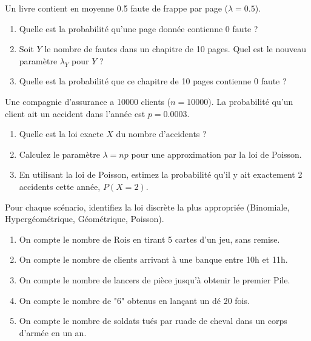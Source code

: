 \begin{exercicebox}
Un livre contient en moyenne 0.5 faute de frappe par page ($\lambda=0.5$).
\begin{enumerate}
    \item Quelle est la probabilité qu'une page donnée contienne 0 faute ?
    \item Soit $Y$ le nombre de fautes dans un chapitre de 10 pages. Quel est le nouveau paramètre $\lambda_Y$ pour $Y$ ?
    \item Quelle est la probabilité que ce chapitre de 10 pages contienne 0 faute ?
\end{enumerate}
\end{exercicebox}

\begin{exercicebox}
Une compagnie d'assurance a 10000 clients ($n=10000$). La probabilité qu'un client ait un accident dans l'année est $p=0.0003$.
\begin{enumerate}
    \item Quelle est la loi exacte $X$ du nombre d'accidents ?
    \item Calculez le paramètre $\lambda = np$ pour une approximation par la loi de Poisson.
    \item En utilisant la loi de Poisson, estimez la probabilité qu'il y ait exactement 2 accidents cette année, $P(X=2)$.
\end{enumerate}
\end{exercicebox}


\begin{exercicebox}
Pour chaque scénario, identifiez la loi discrète la plus appropriée (Binomiale, Hypergéométrique, Géométrique, Poisson).
\begin{enumerate}
    \item On compte le nombre de Rois en tirant 5 cartes d'un jeu, sans remise.
    \item On compte le nombre de clients arrivant à une banque entre 10h et 11h.
    \item On compte le nombre de lancers de pièce jusqu'à obtenir le premier Pile.
    \item On compte le nombre de "6" obtenus en lançant un dé 20 fois.
    \item On compte le nombre de soldats tués par ruade de cheval dans un corps d'armée en un an.
\end{enumerate}
\end{exercicebox}

